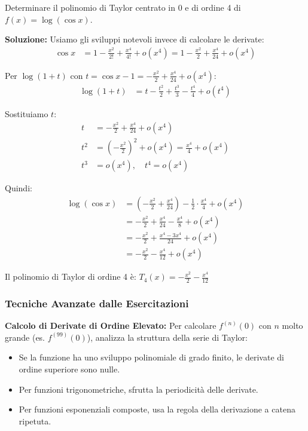 \begin{esempio}
Determinare il polinomio di Taylor centrato in 0 e di ordine 4 di \(f(x) = \log(\cos x)\).

\textbf{Soluzione:} Usiamo gli sviluppi notevoli invece di calcolare le derivate:
\begin{align}
\cos x &= 1 - \frac{x^2}{2!} + \frac{x^4}{4!} + o(x^4) = 1 - \frac{x^2}{2} + \frac{x^4}{24} + o(x^4)
\end{align}

Per \(\log(1+t)\) con \(t = \cos x - 1 = -\frac{x^2}{2} + \frac{x^4}{24} + o(x^4)\):
\begin{align}
\log(1+t) &= t - \frac{t^2}{2} + \frac{t^3}{3} - \frac{t^4}{4} + o(t^4)
\end{align}

Sostituiamo \(t\):
\begin{align}
t &= -\frac{x^2}{2} + \frac{x^4}{24} + o(x^4) \\
t^2 &= \left(-\frac{x^2}{2}\right)^2 + o(x^4) = \frac{x^4}{4} + o(x^4) \\
t^3 &= o(x^4), \quad t^4 = o(x^4)
\end{align}

Quindi:
\begin{align}
\log(\cos x) &= \left(-\frac{x^2}{2} + \frac{x^4}{24}\right) - \frac{1}{2} \cdot \frac{x^4}{4} + o(x^4) \\
&= -\frac{x^2}{2} + \frac{x^4}{24} - \frac{x^4}{8} + o(x^4) \\
&= -\frac{x^2}{2} + \frac{x^4 - 3x^4}{24} + o(x^4) \\
&= -\frac{x^2}{2} - \frac{x^4}{12} + o(x^4)
\end{align}

Il polinomio di Taylor di ordine 4 è: \(T_4(x) = -\frac{x^2}{2} - \frac{x^4}{12}\)
\end{esempio}

\subsubsection{Tecniche Avanzate dalle Esercitazioni}

\begin{info}
\textbf{Calcolo di Derivate di Ordine Elevato:}
Per calcolare $f^{(n)}(0)$ con $n$ molto grande (es. $f^{(99)}(0)$), analizza la struttura della serie di Taylor:
\begin{itemize}
    \item Se la funzione ha uno sviluppo polinomiale di grado finito, le derivate di ordine superiore sono nulle.
    \item Per funzioni trigonometriche, sfrutta la periodicità delle derivate.
    \item Per funzioni esponenziali composte, usa la regola della derivazione a catena ripetuta.
\end{itemize}
\end{info}

